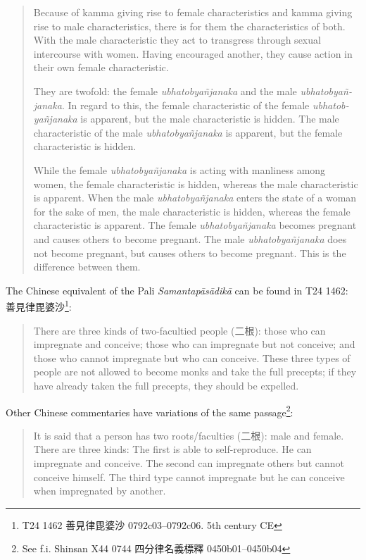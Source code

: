 \begin{quote}
Because of kamma giving rise to female characteristics and kamma giving rise to male characteristics, there is for them the characteristics of both. With the male characteristic they act to transgress through sexual intercourse with women. Having encouraged another, they cause action in their own female characteristic. 

They are twofold: the female {\em ubhatob­yañ­janaka} and the male {\em ubhatob­yañ­janaka}. In regard to this, the female characteristic of the female {\em ubhatob­yañ­janaka} is apparent, but the male characteristic is hidden. The male characteristic of the male {\em ubhatob­yañ­janaka} is apparent, but the female characteristic is hidden. 

While the female {\em ubhatob­yañ­janaka} is acting with manliness among women, the female characteristic is hidden, whereas the male characteristic is apparent. 
When the male {\em ubhatob­yañ­janaka} enters the state of a woman for the sake of men, the male characteristic is hidden, whereas the female characteristic is apparent. 
The female {\em ubhatob­yañ­janaka} becomes pregnant and causes others to become pregnant. The male {\em ubhatob­yañ­janaka} does not become pregnant, but causes others to become pregnant. This is the difference between them.
\end{quote}

The Chinese equivalent of the Pali {\em Samantapāsādikā} can be found in T24 1462: 善見律毘婆沙\footnote{T24 1462 善見律毘婆沙 0792c03–0792c06. 5th century CE}:
\begin{quote}
There are three kinds of two-facultied people (二根): those who can impregnate and conceive; those who can impregnate but not conceive; and those who cannot impregnate but who can conceive. These three types of people are not allowed to become monks and take the full precepts; if they have already taken the full precepts, they should be expelled.
\end{quote}

Other Chinese commentaries have variations of the same passage\footnote{See f.i. Shinsan X44 0744 四分律名義標釋 0450b01–0450b04}:
\begin{quote}
It is said that a person has two roots/faculties (二根): male and female. There are three kinds: The first is able to self-reproduce. He can impregnate and conceive. The second can impregnate others but cannot conceive himself. The third type cannot impregnate but he can conceive when impregnated by another. 
\end{quote}

